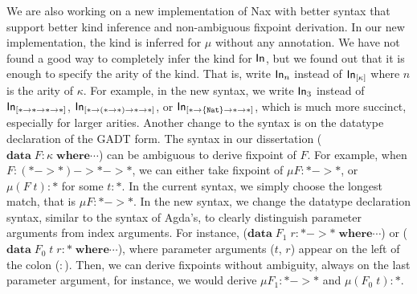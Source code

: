 We are also working on a new implementation of Nax with better syntax
that support better kind inference and non-ambiguous fixpoint derivation.
In our new implementation, the kind is inferred for $\mu$ without
any annotation. We have not found a good way to completely infer the kind
for $\mathsf{In}$, but we found out that it is enough to specify the arity of the kind.
That is, write $\mathsf{In}_n$ instead of $\mathsf{In}_{[\kappa]}$ where $n$ is the arity of
$\kappa$. For example, in the new syntax, we write $\mathsf{In}_3$ instead of
$\mathsf{In}_{[* -> * -> * -> *]}$, $\mathsf{In}_{[* -> (* -> *) -> * -> *]}$, or
$\mathsf{In}_{[* -> \{\texttt{Nat}\} -> * -> *]}$, which is much more succinct,
especially for larger arities. Another change to the syntax is on
the datatype declaration of the GADT form. The syntax in our dissertation
($\mathbf{data}\;F : \kappa\;\mathbf{where} \cdots$) can be ambiguous
to derive fixpoint of $F$. For example, when $F : (* -> *) -> * -> *$,
we can either take fixpoint of $\mu F : * -> *$, or $\mu (F\;t) : *$
for some $t : *$. In the current syntax, we simply choose the longest match,
that is $\mu F : * -> *$. In the new syntax, we change the datatype declaration
syntax, similar to the syntax of Agda's, to clearly distinguish
parameter arguments from index arguments.
For instance,
($\mathbf{data}\;F_1\;r: * -> * \;\mathbf{where} \cdots$) or
($\mathbf{data}\;F_0\;t\;r: * \;\mathbf{where} \cdots$), where
parameter arguments ($t$, $r$) appear on the left of the colon ($:$).
Then, we can derive fixpoints without ambiguity, always on the last
parameter argument, for instance, we would derive $\mu F_1 : * -> *$
and $\mu(F_0\;t): *$.

